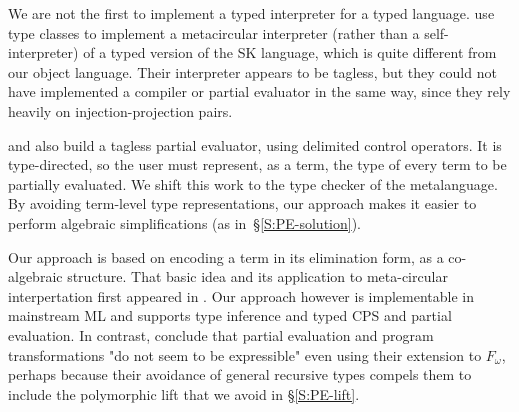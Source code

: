 We are not the first to implement a typed interpreter for a typed
language.   use type classes to implement a metacircular
interpreter (rather than a self\hyp interpreter) of a
typed version of the SK language, which is quite different from our
object language.  Their interpreter
appears to be tagless, but they could not have implemented a
compiler or partial evaluator in the same way, since they rely
heavily on injection\hyp projection pairs.

 and \citet{balat:tdpe-popl2004} also build
a tagless partial evaluator, using delimited control operators.  It is
type-directed, so the user must represent, as a term, the type of every
term to be partially evaluated.  We shift this work to the type checker
of the metalanguage.  By avoiding term-level type representations, our
approach makes it easier to perform algebraic simplifications (as
in~\S\ref{S:PE-solution}).


Our approach is based on encoding a term in its elimination form, as a
co-algebraic structure. That basic idea and its application to
meta-circular interpertation first appeared in \citet{Pfenning-Lee}.
Our approach however is implementable in mainstream ML and supports
type inference and typed CPS and partial evaluation. In contrast,
\cite{Pfenning-Lee} conclude that partial evaluation and program
transformations "do not seem to be expressible" even using their
extension to $F_{\omega}$, perhaps because their avoidance of general
recursive types compels them to include the polymorphic lift that we
avoid in \S\ref{S:PE-lift}.
\begin{comment}
It seems that Pfenning and Lee embed $F_2$ with type constructions in 
(pure) $F_3$.  We embed $F_1$ in (weak?) $F_2$, as I see it.  In a way, what 
we do is very similar to what they do (Figure 1, p.152), except that we 
do it in standard programming languges.  It is unclear if their work can 
be implemented (yet) in any language.  And we preserve type-inference, 
while their solution needs explcit types!
The following line of their conclusion is worth citing: "... this does 
not imply that the same language is also suitable for type 
metaprogramming. ... such as partial evaluation... do not seem to be 
expressible".
I suspect you're right, but I'm still reading the paper.  See also page
146: "for a term M in $F_1$ (a simply-typed term), the representation
$\bar{M}$ will be in $F_2$".  The move from $F_2$ to $F_3$ 
and beyond reminds me
strongly of our attempts at self-interpretation without the notion of a
syntactic hole.
\end{comment}

